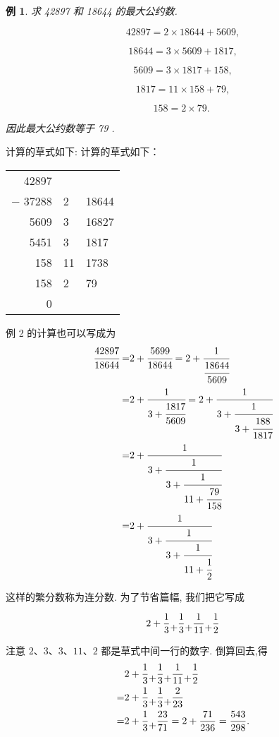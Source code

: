 \documentclass{ctexart}
\newcommand{\cplus}{\raisebox{-1ex}{+}}
\newtheorem{example}{\indent 例}[section]
\begin{document}
\begin{example}
  求 42897 和 18644 的最大公约数.

\[
{42897} = 2 \times {18644} + {5609},
\]

\[
{18644} = 3 \times {5609} + {1817},
\]

\[
{5609} = 3 \times {1817} + {158},
\]

\[
{1817} = {11} \times {158} + {79},
\]

\[
{158} = 2 \times {79}\text{. }
\]

因此最大公约数等于 79 .

\end{example}

计算的草式如下:
计算的草式如下：

\begin{table}[h]
 \centering
\begin{tabular}{r|l|l}
42897 &    &       \\
$-$ 37288 & 2  & 18644 \\ \cline{1-1}
5609  & 3  & 16827 \\ \cline{3-3} 
5451  & 3  & 1817  \\ \cline{1-1}
158   & 11 & 1738  \\ \cline{3-3} 
158   & 2  & 79    \\ \cline{1-1}
0     &    &      
\end{tabular}
\end{table}

例 2 的计算也可以写成为
\begin{align*}
\cfrac{42897}{18644} = &2 + \cfrac{5699}{18644} = 2 + \cfrac{1}{\cfrac{18644}{5609}}\\
= &2 + \cfrac{1}{3 + \cfrac{1817}{5609}} = 2 + \cfrac{1}{3 + \cfrac{1}{3 + \cfrac{188}{1817}}}\\
= &2 + \cfrac{1}{3 + \cfrac{1}{3 + \cfrac{1}{{11} + \cfrac{79}{158}}}}\\
= &2 + \cfrac{1}{3 + \cfrac{1}{3 + \cfrac{1}{{11} + \cfrac{1}{2}}}}
\end{align*}


这样的繁分数称为连分数. 为了节省篇幅, 我们把它写成

\[
2 + \frac{1}{3} \cplus \frac{1}{3} \cplus \frac{1}{11} \cplus \frac{1}{2}
\]

注意 \(2\text{、}3\text{、}3\text{、}{11}\text{、}2\) 都是草式中间一行的数字. 倒算回去,得
\begin{align*}
  &2 + \frac{1}{3} \cplus \frac{1}{3} \cplus \frac{1}{11} \cplus \frac{1}{2}\\
    = &2 + \frac{1}{3} \cplus \frac{1}{3} \cplus \frac{2}{23}\\
= &2 + \frac{1}{3} \cplus \frac{23}{71} = 2 + \frac{71}{236} = \frac{543}{298}.
\end{align*}
\end{document}

